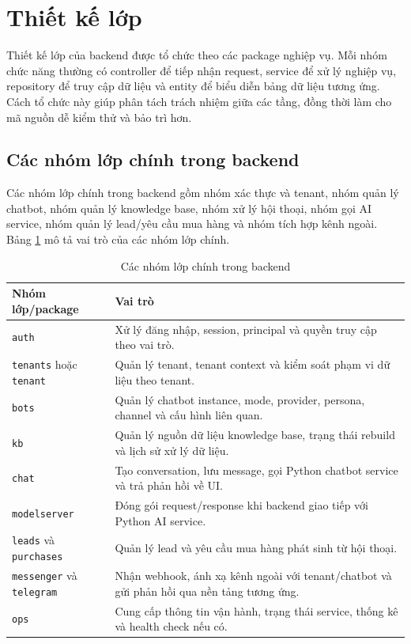 \documentclass[../DoAn.tex]{subfiles}
\begin{document}
\section{Thiết kế lớp}

Thiết kế lớp của backend được tổ chức theo các package nghiệp vụ. Mỗi nhóm chức năng thường có controller để tiếp nhận request, service để xử lý nghiệp vụ, repository để truy cập dữ liệu và entity để biểu diễn bảng dữ liệu tương ứng. Cách tổ chức này giúp phân tách trách nhiệm giữa các tầng, đồng thời làm cho mã nguồn dễ kiểm thử và bảo trì hơn.

\subsection{Các nhóm lớp chính trong backend}

Các nhóm lớp chính trong backend gồm nhóm xác thực và tenant, nhóm quản lý chatbot, nhóm quản lý knowledge base, nhóm xử lý hội thoại, nhóm gọi AI service, nhóm quản lý lead/yêu cầu mua hàng và nhóm tích hợp kênh ngoài. Bảng \ref{tab:ch4-backend-classes} mô tả vai trò của các nhóm lớp chính.

\begin{table}[H]
\centering
\caption{Các nhóm lớp chính trong backend}
\label{tab:ch4-backend-classes}
\begin{tabular}{|p{}|p{}|}
\hline
\textbf{Nhóm lớp/package} & \textbf{Vai trò} \\
\hline
\texttt{auth} & Xử lý đăng nhập, session, principal và quyền truy cập theo vai trò. \\
\hline
\texttt{tenants} hoặc \texttt{tenant} & Quản lý tenant, tenant context và kiểm soát phạm vi dữ liệu theo tenant. \\
\hline
\texttt{bots} & Quản lý chatbot instance, mode, provider, persona, channel và cấu hình liên quan. \\
\hline
\texttt{kb} & Quản lý nguồn dữ liệu knowledge base, trạng thái rebuild và lịch sử xử lý dữ liệu. \\
\hline
\texttt{chat} & Tạo conversation, lưu message, gọi Python chatbot service và trả phản hồi về UI. \\
\hline
\texttt{modelserver} & Đóng gói request/response khi backend giao tiếp với Python AI service. \\
\hline
\texttt{leads} và \texttt{purchases} & Quản lý lead và yêu cầu mua hàng phát sinh từ hội thoại. \\
\hline
\texttt{messenger} và \texttt{telegram} & Nhận webhook, ánh xạ kênh ngoài với tenant/chatbot và gửi phản hồi qua nền tảng tương ứng. \\
\hline
\texttt{ops} & Cung cấp thông tin vận hành, trạng thái service, thống kê và health check nếu có. \\
\hline
\end{tabular}
\end{table}
\end{document}
